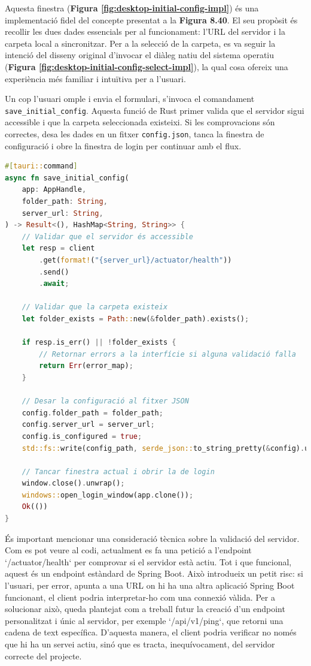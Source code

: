 Aquesta finestra (\textbf{Figura \ref{fig:desktop-initial-config-impl}}) és una implementació fidel del concepte presentat a la \textbf{Figura 8.40}. El seu propòsit és recollir les dues dades essencials per al funcionament: l'URL del servidor i la carpeta local a sincronitzar. Per a la selecció de la carpeta, es va seguir la intenció del disseny original d'invocar el diàleg natiu del sistema operatiu (\textbf{Figura \ref{fig:desktop-initial-config-select-impl}}), la qual cosa ofereix una experiència més familiar i intuïtiva per a l'usuari.

Un cop l'usuari omple i envia el formulari, s'invoca el comandament \texttt{save\_initial\_config}. Aquesta funció de Rust primer valida que el servidor sigui accessible i que la carpeta seleccionada existeixi. Si les comprovacions són correctes, desa les dades en un fitxer \texttt{config.json}, tanca la finestra de configuració i obre la finestra de login per continuar amb el flux.

\begin{lstlisting}[language=Rust, caption={Comandament per desar la configuració inicial a \texttt{main.rs}}]
#[tauri::command]
async fn save_initial_config(
    app: AppHandle,
    folder_path: String,
    server_url: String,
) -> Result<(), HashMap<String, String>> {
    // Validar que el servidor és accessible
    let resp = client
        .get(format!("{server_url}/actuator/health"))
        .send()
        .await;
        
    // Validar que la carpeta existeix
    let folder_exists = Path::new(&folder_path).exists();
    
    if resp.is_err() || !folder_exists {
        // Retornar errors a la interfície si alguna validació falla
        return Err(error_map);
    }
    
    // Desar la configuració al fitxer JSON
    config.folder_path = folder_path;
    config.server_url = server_url;
    config.is_configured = true;
    std::fs::write(config_path, serde_json::to_string_pretty(&config).unwrap()).unwrap();
    
    // Tancar finestra actual i obrir la de login
    window.close().unwrap();
    windows::open_login_window(app.clone());
    Ok(())
}
\end{lstlisting}

És important mencionar una consideració tècnica sobre la validació del servidor. Com es pot veure al codi, actualment es fa una petició a l'endpoint `/actuator/health` per comprovar si el servidor està actiu. Tot i que funcional, aquest és un endpoint estàndard de Spring Boot. Això introdueix un petit risc: si l'usuari, per error, apunta a una URL on hi ha una altra aplicació Spring Boot funcionant, el client podria interpretar-ho com una connexió vàlida. Per a solucionar això, queda plantejat com a treball futur la creació d'un endpoint personalitzat i únic al servidor, per exemple `/api/v1/ping`, que retorni una cadena de text específica. D'aquesta manera, el client podria verificar no només que hi ha un servei actiu, sinó que es tracta, inequívocament, del servidor correcte del projecte.

